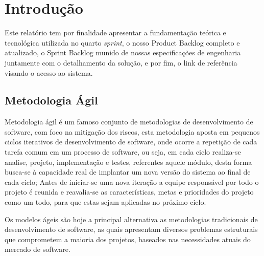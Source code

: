 \documentclass{abnt}
\begin{document}





\capa

\folhaderosto

\tableofcontents

\listoffigures


\chapter{Introdução}

	Este relatório tem por finalidade apresentar a fundamentação teórica e tecnológica utilizada no quarto \emph{sprint}, o nosso Product Backlog completo e atualizado, 
	o Sprint Backlog munido de nossas especificações de engenharia juntamente com o detalhamento da solução, e por fim, o link de referência visando o acesso ao sistema.

	\section{Metodologia Ágil}
	
		Metodologia ágil é um famoso conjunto de metodologias de desenvolvimento de software, 
		com foco na mitigação dos riscos, esta metodologia aposta em pequenos ciclos iterativos de desenvolvimento de software,
		onde ocorre a repetição de cada tarefa comum em um processo de software, ou seja, em cada ciclo realiza-se analise, projeto,
		implementação e testes, referentes aquele módulo, desta forma busca-se à capacidade real de implantar um nova versão 
		do sistema ao final de cada ciclo;  Antes de iniciar-se uma nova iteração a equipe responsável por todo o projeto é reunida 
		e reavalia-se as características, metas e prioridades do projeto como um todo, para que estas sejam aplicadas no próximo ciclo.
		
		Os modelos ágeis são hoje a principal alternativa as metodologias tradicionais de desenvolvimento de software, 
		as quais apresentam diversos problemas estruturais que comprometem a maioria dos projetos, 
		baseados nas necessidades atuais do mercado de software.
	
\end{document}
